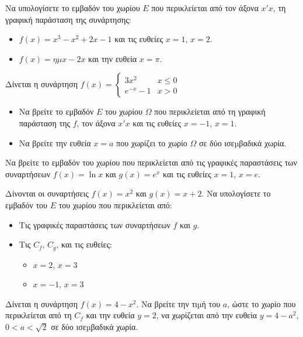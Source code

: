 \documentclass{presentation}
\begin{document}
\begin{askisi}
  Να υπολογίσετε το εμβαδόν του χωρίου $E$ που περικλείεται από τον άξονα $x'x$, τη γραφική παράσταση της συνάρτησης:
  \begin{itemize}[<+->]
    \item $f(x)=x^3-x^2+2x-1$ και τις ευθείες $x=1$, $x=2$.
    \item $f(x)=ημx-2x$ και την ευθεία $x=π$.
  \end{itemize}
\end{askisi}


\begin{askisi}
  Δίνεται η συνάρτηση $f(x)=\begin{cases}
      3x^2     & x \leq 0 \\
      e^{-x}-1 & x>0
    \end{cases}$
  \begin{itemize}[<+->]
    \item Να βρείτε το εμβαδόν $E$ του χωρίου $Ω$ που περικλείεται από τη γραφική παράσταση της $f$, τον άξονα $x'x$ και τις ευθείες $x=-1$, $x=1$.
    \item Να βρείτε την ευθεία $x=a$ που χωρίζει το χωρίο $Ω$ σε δύο ισεµβαδικά χωρία.
  \end{itemize}
\end{askisi}

\begin{askisi}
  Να βρείτε το εμβαδόν του χωρίου που περικλείεται από τις γραφικές παραστάσεις των συναρτήσεων $f(x)=\ln x$ και $g(x)=e^x$ και τις ευθείες $x=1$, $x=e$.
\end{askisi}


\begin{askisi}
  Δίνονται οι συναρτήσεις $f(x)=x^2$ και $g(x)=x+2$. Να υπολογίσετε το εμβαδόν του $E$ του χωρίου που περικλείεται από:
  \begin{itemize}[<+->]
    \item Τις γραφικές παραστάσεις των συναρτήσεων $f$ και $g$.
    \item Τις $C_f$, $C_g$, και τις ευθείες:
          \begin{itemize}[<+->]
            \item $x=2$, $x=3$
            \item $x=-1$, $x=3$
          \end{itemize}
  \end{itemize}
\end{askisi}


\begin{askisi}
  Δίνεται η συνάρτηση $f(x)=4-x^2$. Να βρείτε την τιµή του $a$, ώστε το χωρίο που περικλείεται από τη $C_f$ και την ευθεία $y=2$, να χωρίζεται από την ευθεία $y=4-a^2$, $0<a<\sqrt{2}$ σε δύο ισεµβαδικά χωρία.
\end{askisi}
\end{document}

